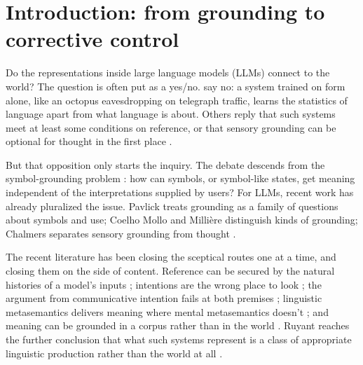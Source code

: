 \documentclass[12pt]{article}
\begin{document}
\section{Introduction: from grounding to corrective control}\label{sec:intro}

Do the representations inside large language models (LLMs) connect to the world? The
question is often put as a yes/no. \textcite{bender2020} say no: a system trained on
form alone, like an octopus eavesdropping on telegraph traffic, learns the statistics
of language apart from what language is about. Others reply that such systems
meet at least some conditions on reference, or that sensory grounding can be optional
for thought in the first place
\citep{coelho_mollo_milliere_2026_vector_grounding_problem,chalmers_2023_thought_sensory_grounding_llms}.

But that opposition only starts the inquiry. The debate descends from the symbol-grounding
problem
\citep{harnad_1990_symbol_grounding_problem}: how can symbols, or symbol-like states,
get meaning independent of the interpretations supplied by users? For LLMs, recent work
has already pluralized the issue. Pavlick treats grounding as a family of questions about
symbols and use; Coelho Mollo and Millière distinguish kinds of grounding; Chalmers
separates sensory grounding from thought
\citep{pavlick_2023_symbols_and_grounding_llms,coelho_mollo_milliere_2026_vector_grounding_problem,chalmers_2023_thought_sensory_grounding_llms}.

The recent literature has been closing the sceptical routes one at a time, and closing
them on the side of content. Reference can be secured by the natural histories of a
model's inputs \citep{mandelkern_linzen_2024_do_language_models_words_refer}; intentions
are the wrong place to look \citep{pepp_2025_reference_without_intentions_llms}; the
argument from communicative intention fails at both premises
\citep{attah_2025_do_language_models_lack_communicative_intentions}; linguistic
metasemantics delivers meaning where mental metasemantics doesn't
\citep{grindrod_2024_large_language_models_linguistic_intentionality}; and meaning can be
grounded in a corpus rather than in the world
\citep{havlik_2024_meaning_understanding_llms_synthese}. Ruyant reaches the further
conclusion that what such systems represent is a class of appropriate linguistic
production rather than the world at all
\citep{ruyant_2026_what_do_llms_represent}.
\end{document}
